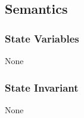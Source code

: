 \documentclass[12pt, titlepage]{article}
\begin{document}
\subsection*{Semantics}
\subsubsection* {State Variables}
None
\subsubsection* {State Invariant}
None

\newpage



\end{document}

